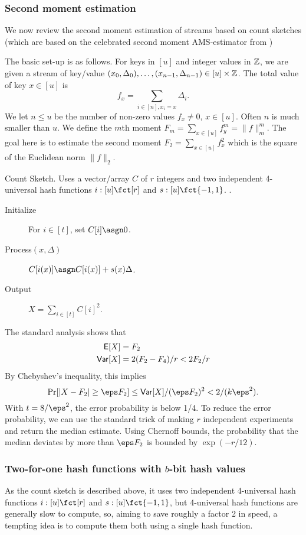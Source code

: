 \subsubsection{Second moment estimation}
We now review the second moment estimation of streams based on count
sketches \cite{charikar04count-sketch} (which are based on the
celebrated second moment AMS-estimator from \cite{alon96frequency})

The basic set-up is as follows.  For keys in $[u]$ and integer values in $\mathbb Z$, we are given a stream of key/value $(x_0,\Delta_0),\ldots, (x_{n-1},\Delta_{n-1})\in [u]\times\mathbb Z$. The
total value of key $x\in[u]$ is
\[f_x=\sum_{i\in[n],x_i=x} \Delta_i.\]
We let $n\leq u$ be  the number of non-zero values
$f_x\neq 0$, $x\in [u]$. Often $n$ is much smaller than $u$.
We define the $m$th moment
$F_m=\sum_{x\in [u]}f_y^m=\|f\|_m^m$. The goal here is to
estimate the second moment $F_2=\sum_{x\in [u]}f_x^2$ which is the square of the Euclidean norm $\|f\|_2$. 

\begin{algorithm}
  \caption{\label{alg:count-sketch} Count Sketch. Uses a
vector/array $C$ of $r$ integers and two independent
4-universal hash functions $i:[u]\fct[r]$ and $s:[u]\fct\{-1,1\}$.
.}
\begin{description}
\item[Initialize] For $i\in[t]$, set $C[i]\asgn 0$.
\item[Process$(x,\Delta)$] $C[i(x)]\asgn C[i(x)]+s(x) \Delta$. 
\item[Output] $X=\sum_{i\in[t]} C[i]^2$.
\end{description}
\end{algorithm}
The standard analysis \cite{charikar04count-sketch} shows that 
\begin{align}
\operatorname*{\sf{E}}[X]&=F_2\label{eq:E-F2}\\
{\sf Var}[X]&=2(F_2-F_4)/r<2F_2/r\label{eq:V-F2}
\end{align}
By Chebyshev's inequality, this implies
\[\Pr[|X-F_2|\geq \eps F_2]\leq \Var[X]/(\eps F_2)^2<
2/(k\eps^2).\]
With $t=8/\eps^2$, the error probability is below 1/4.
To
reduce the error probability, we can use the standard trick of
making $r$ independent experiments
and return the median estimate. Using Chernoff bounds, the probability
that the median deviates by more than $\eps F_2$ is bounded by
$\exp(-r/12)$.

\subsubsection{Two-for-one hash functions with $b$-bit hash values}
As the count sketch is described above,
it uses two independent 4-universal hash functions
$i:[u]\fct[r]$ and $s:[u]\fct\{-1,1\}$, but 4-universal hash functions
are generally slow to compute, so, aiming to save roughly a factor 2
in speed, a tempting idea is to compute them both using a single hash
function.

